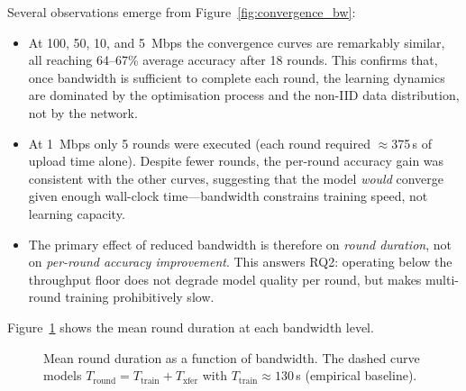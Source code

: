 \documentclass[12pt,a4paper]{report}
\begin{document}
Several observations emerge from Figure~\ref{fig:convergence_bw}:

\begin{itemize}
  \item At 100, 50, 10, and 5~Mbps the convergence curves are remarkably
        similar, all reaching 64--67\% average accuracy after 18 rounds.
        This confirms that, once bandwidth is sufficient to complete each
        round, the learning dynamics are dominated by the optimisation
        process and the non-IID data distribution, not by the network.
  \item At 1~Mbps only 5 rounds were executed (each round required
        $\approx$375\,s of upload time alone).  Despite fewer rounds, the
        per-round accuracy gain was consistent with the other curves,
        suggesting that the model \emph{would} converge given enough wall-clock
        time---bandwidth constrains training speed, not learning capacity.
  \item The primary effect of reduced bandwidth is therefore on
        \emph{round duration}, not on \emph{per-round accuracy improvement}.
        This answers RQ2: operating below the throughput floor does not
        degrade model quality per round, but makes multi-round training
        prohibitively slow.
\end{itemize}

Figure~\ref{fig:round_duration_bw} shows the mean round duration at each
bandwidth level.

\begin{figure}[H]
\centering
{}
\caption{Mean round duration as a function of bandwidth.  The dashed
  curve models $T_{\mathrm{round}} = T_{\mathrm{train}} + T_{\mathrm{xfer}}$
  with $T_{\mathrm{train}} \approx 130$\,s (empirical baseline).}
\label{fig:round_duration_bw}
\end{figure}
\end{document}
